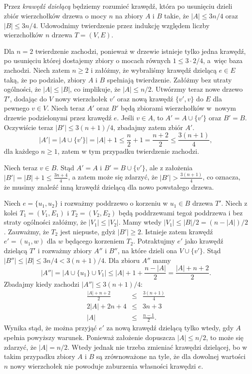 \subsection{} %

\subsubsection{} %
Przez \emph{krawędź dzielącą} będziemy rozumieć krawędź, która po usunięciu dzieli zbiór wierzchołków drzewa o mocy $n$ na zbiory $A$ i $B$ takie, że $|A|\le 3n/4$ oraz $|B|\le 3n/4$. Udowodnimy twierdzenie przez indukcję względem liczby wierzchołków $n$ drzewa $T=(V,E)$.

Dla $n=2$ twierdzenie zachodzi, ponieważ w drzewie istnieje tylko jedna krawędź, po usunięciu której dostajemy zbiory o mocach równych $1\le 3\cdot 2/4$, a~więc baza zachodzi. Niech zatem $n\ge 2$ i załóżmy, że wybraliśmy krawędź dzielącą $e\in E$ taką, że po podziale, zbiory $A$ i $B$ spełniają twierdzenie. Załóżmy bez utraty ogólności, że $|A|\le |B|$, co implikuje, że $|A|\le n/2$. Utwórzmy teraz nowe drzewo $T'$, dodając do $V$ nowy wierzchołek $v'$ oraz nową krawędź $\{v',v\}$ do $E$ dla pewnego $v\in V$. Niech teraz $A'$ oraz $B'$ będą zbiorami wierzchołków w~nowym drzewie podzielonymi przez krawędź $e$. Jeśli $v\in A$, to $A'=A\cup \{v'\}$ oraz $B'=B$. Oczywiście teraz $|B'|\le 3(n+1)/4$, zbadajmy zatem zbiór $A'$.
\[
	|A'| = |A\cup \{v'\}| = |A|+1\le\frac{n}{2}+1 = \frac{n+2}{2}\le\frac{3(n+1)}{4},
\]
dla każdego $n\ge 1$, zatem w tym przypadku twierdzenie zachodzi.

Niech teraz $v\in B$. Stąd $A'=A$ i $B'=B\cup \{v'\}$, ale z założenia $|B'|=|B|+1\le\frac{3n+4}{4}$, a zatem może się zdarzyć, że $|B'|>\frac{3(n+1)}{4}$, co oznacza, że musimy znaleźć inną krawędź dzielącą dla nowo powstałego drzewa.

Niech $e=\{u_1,u_2\}$ i rozważmy poddrzewo o korzeniu w $u_1\in B$ drzewa $T'$. Niech z kolei $T_1=(V_1,E_1)$ i $T_2=(V_2,E_2)$ będą poddrzewami tegoż poddrzewa i bez straty ogólności załóżmy, że $|V_1|\le |V_2|$. Mamy wtedy $|V_1|\le |B|/2=(n-|A|)/2$. Zauważmy, że $T_2$ jest niepuste, gdyż $|B'|\ge 2$. Istnieje zatem krawędź $e'=(u_1,w)$ dla $w$ będącego korzeniem $T_2$. Potraktujmy $e'$ jako krawędź dzielącą $T'$ i rozważmy zbiory $A''$ i $B''$, na które dzieli ona $V\cup \{v'\}$. Stąd $|B''|\le|B|\le 3n/4<3(n+1)/4$. Dla zbioru $A''$ mamy
\[
	|A''| = |A\cup\{u_1\}\cup V_1|\le |A|+1+\frac{n-|A|}{2} = \frac{|A|+n+2}{2}.
\]
Zbadajmy kiedy zachodzi $|A''|\le 3(n+1)/4$:
\begin{eqnarray*}
	\frac{|A|+n+2}{2} &\le& \frac{3(n+1)}{4} \\
	2|A|+2n+4 &\le& 3n+3 \\
	|A| &\le& \frac{n-1}{2}.
\end{eqnarray*}
Wynika stąd, że można przyjąć $e'$ za nową krawędź dzielącą tylko wtedy, gdy $A$ spełnia powyższy warunek. Ponieważ założenie dopuszcza $|A|\le n/2$, to może się zdarzyć, że $|A|=n/2$. Wtedy jednak nie trzeba zmieniać krawędzi dzielącej, bo w takim przypadku zbiory $A$ i $B$ są zrównoważone na tyle, że dla dowolnej wartości $n$ nowy wierzchołek nie powoduje zaburzenia własności krawędzi $e$.

